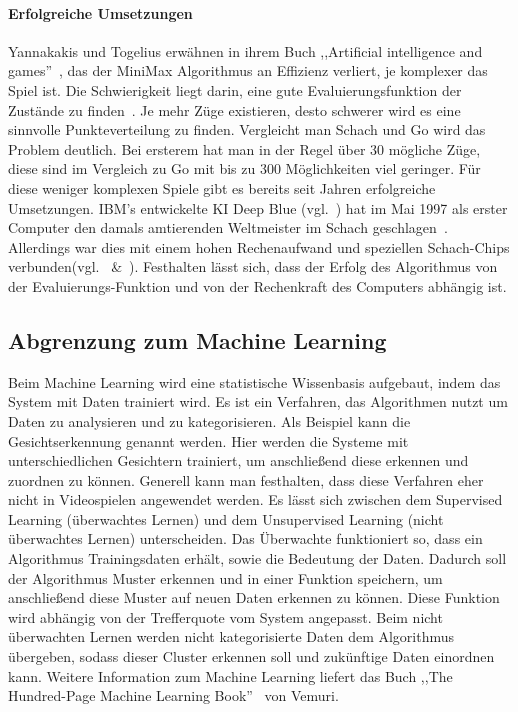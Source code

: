 \paragraph{Erfolgreiche Umsetzungen}
Yannakakis und Togelius erwähnen in ihrem Buch ,,Artificial intelligence and games''~\cite{yannakakis2018artificial}, das der MiniMax Algorithmus an Effizienz verliert, je komplexer das Spiel ist. Die Schwierigkeit liegt darin, eine gute Evaluierungsfunktion der Zustände zu finden~\cite{yannakakis2018artificial}. Je mehr Züge existieren, desto schwerer wird es eine sinnvolle Punkteverteilung zu finden. Vergleicht man Schach und Go wird das Problem deutlich. Bei ersterem hat man in der Regel über 30 mögliche Züge, diese sind im Vergleich zu Go mit bis zu 300 Möglichkeiten viel geringer. Für diese weniger komplexen Spiele gibt es bereits seit Jahren erfolgreiche Umsetzungen. IBM's entwickelte KI Deep Blue (vgl.~\cite{DBLP:journals/micro/Hsu99}) hat im Mai 1997 als erster Computer den damals amtierenden Weltmeister im Schach geschlagen~\cite{DBLP:journals/cse/Hsu06}. Allerdings war dies mit einem hohen Rechenaufwand und speziellen Schach-Chips verbunden(vgl.~\cite{DBLP:journals/micro/Hsu99} \&~\cite{DBLP:journals/cse/Hsu06}).
Festhalten lässt sich, dass der Erfolg des Algorithmus von der Evaluierungs-Funktion und von der Rechenkraft des Computers abhängig ist.

\subsection{Abgrenzung zum Machine Learning}
\label{ch:Grundlagen:sec:Learning}
Beim Machine Learning wird eine statistische Wissenbasis aufgebaut, indem das System mit Daten trainiert wird. Es ist ein Verfahren, das Algorithmen nutzt um Daten zu analysieren und zu kategorisieren. Als Beispiel kann die Gesichtserkennung genannt werden. Hier werden die Systeme mit unterschiedlichen Gesichtern trainiert, um anschließend diese erkennen und zuordnen zu können. Generell kann man festhalten, dass diese Verfahren eher nicht in Videospielen angewendet werden. Es lässt sich zwischen dem Supervised Learning (überwachtes Lernen) und dem Unsupervised Learning (nicht überwachtes Lernen) unterscheiden.
Das Überwachte funktioniert so, dass ein Algorithmus Trainingsdaten erhält, sowie die Bedeutung der Daten. Dadurch soll der Algorithmus Muster erkennen und in einer Funktion speichern, um anschließend diese Muster auf neuen Daten erkennen zu können. Diese Funktion wird abhängig von der Trefferquote vom System angepasst.
Beim nicht überwachten Lernen werden nicht kategorisierte Daten dem Algorithmus übergeben, sodass dieser Cluster erkennen soll und zukünftige Daten einordnen kann. Weitere Information zum Machine Learning liefert das Buch ,,The Hundred-Page Machine Learning Book''~\cite{vemuri2020hundred} von Vemuri.  \\

